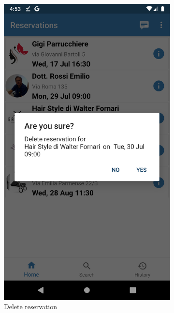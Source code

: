 \begin{figure}[h]
\centering
\begin{subfigure}{.5\textwidth}
  \centering
  \includegraphics[height=.4\textheight, keepaspectratio=true]{Img/Screens/Customer_Home_Delete}
  \caption{Delete reservation}
\end{subfigure}%
\begin{subfigure}{.5\textwidth}
  \centering

\end{subfigure}
\end{figure}
